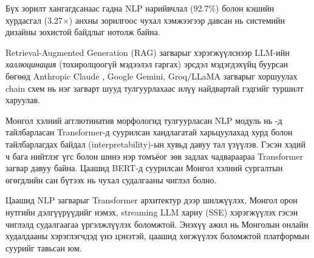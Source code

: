 \documentclass[12pt,a4paper]{report}
\begin{document}
Бүх зорилт хангагдсанаас гадна NLP нарийвчлал (92.7\%) болон кэшийн хурдасгал (3.27$\times$) анхны зорилгоос чухал хэмжээгээр давсан нь системийн дизайны зохистой байдлыг нотолж байна.

Retrieval-Augmented Generation (RAG) загварыг хэрэгжүүлснээр \cite{lewis2020rag} LLM-ийн \textit{халлюцинация} (тохиролцоогүй мэдээлэл гаргах) эрсдэл мэдэгдэхүйц буурсан бөгөөд Anthropic Claude \cite{anthropic2024}, Google Gemini, Groq/LLaMA загварыг хоршуулах chain схем нь нэг загварт шууд тулгуурлахаас илүү найдвартай гэдгийг туршилт харуулав.

Монгол хэлний агглютинатив морфологид тулгуурласан NLP модуль нь \cite{devlin2018bert}-д тайлбарласан Transformer-д суурилсан хандлагатай харьцуулахад хурд болон тайлбарлагдах байдал (interpretability)-ын хувьд давуу тал үзүүлэв. Гэсэн хэдий ч бага нийтлэг үгс болон шинэ нэр томъёог зөв задлах чадвараараа Transformer загвар давуу байна. Цаашид BERT-д суурилсан \cite{devlin2018bert} Монгол хэлний сургалтын өгөгдлийн сан бүтээх нь чухал судалгааны чиглэл болно.

Цаашид NLP загварыг Transformer архитектур дээр шилжүүлэх, Монгол орон нутгийн дэлгүүрүүдийг нэмэх, streaming LLM хариу (SSE) хэрэгжүүлэх гэсэн чиглэлд судалгаагаа үргэлжлүүлэх боломжтой. Энэхүү ажил нь Монголын онлайн худалдааны хэрэглэгчдэд үнэ цэнэтэй, цаашид хөгжүүлэх боломжтой платформын суурийг тавьсан юм.
\end{document}
